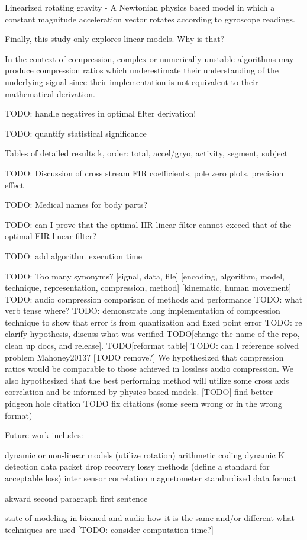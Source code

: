 \documentclass[journal]{IEEEtran}
\begin{document}
Linearized rotating gravity - A Newtonian physics based model in which a constant magnitude acceleration vector rotates according to gyroscope readings.

Finally, this study only explores linear models. Why is that?

 In the context of compression, complex or numerically unstable algorithms may produce compression ratios which underestimate their understanding of the underlying signal since their implementation is not equivalent to their mathematical derivation.

TODO: handle negatives in optimal filter derivation!

TODO: quantify statistical significance

Tables of detailed results k, order: total, accel/gryo, activity, segment, subject 

TODO: Discussion of cross stream FIR coefficients, pole zero plots, precision effect

TODO: Medical names for body parts?

TODO: can I prove that the optimal IIR linear filter cannot exceed that of the optimal FIR linear filter?

TODO: add algorithm execution time

TODO: Too many synonyms? [signal, data, file] [encoding, algorithm, model, technique, representation, compression, method] [kinematic, human movement]
TODO: audio compression comparison of methods and performance
TODO: what verb tense where?
TODO: demonstrate long implementation of compression technique to show that error is from quantization and fixed point error
TODO: re clarify hypothesis, discuss what was verified
TODO[change the name of the repo, clean up docs, and release]. 
TODO[reformat table]
TODO: can I reference solved problem Mahoney2013?
[TODO remove?]  We hypothesized that compression ratios would be comparable to those achieved in lossless audio compression. We also hypothesized that the best performing method will utilize some cross axis correlation and be informed by physics based models.
[TODO] find better pidgeon hole citation
TODO fix citations (some seem wrong or in the wrong format)

Future work includes:

dynamic or non-linear models (utilize rotation)
arithmetic coding
dynamic K detection
data packet drop recovery
lossy methods (define a standard for acceptable loss)
inter sensor correlation
magnetometer
standardized data format

akward second paragraph first sentence

state of modeling in biomed and audio
how it is the same and/or different
what techniques are used
[TODO: consider computation time?]
\end{document}
